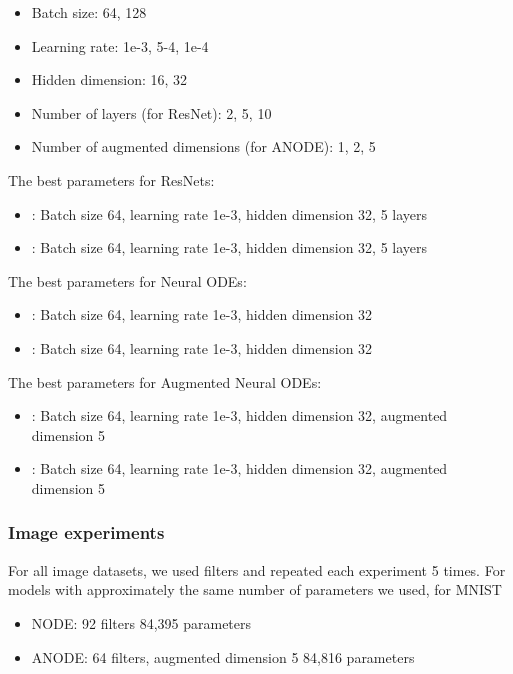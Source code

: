 \documentclass{article}
\begin{document}
\begin{itemize}
    \item Batch size: 64, 128
    \item Learning rate: 1e-3, 5-4, 1e-4
    \item Hidden dimension: 16, 32 
    \item Number of layers (for ResNet): 2, 5, 10
    \item Number of augmented dimensions (for ANODE): 1, 2, 5
\end{itemize}

The best parameters for ResNets:

\begin{itemize}
    \item : Batch size 64, learning rate 1e-3, hidden dimension 32, 5 layers
    \item : Batch size 64, learning rate 1e-3, hidden dimension 32, 5 layers
\end{itemize}

The best parameters for Neural ODEs:

\begin{itemize}
    \item : Batch size 64, learning rate 1e-3, hidden dimension 32
    \item : Batch size 64, learning rate 1e-3, hidden dimension 32
\end{itemize}

The best parameters for Augmented Neural ODEs:

\begin{itemize}
    \item : Batch size 64, learning rate 1e-3, hidden dimension 32, augmented dimension 5
    \item : Batch size 64, learning rate 1e-3, hidden dimension 32, augmented dimension 5
\end{itemize}

\subsubsection{Image experiments}

For all image datasets, we used  filters and repeated each experiment 5 times. For models with approximately the same number of parameters we used, for MNIST

\begin{itemize}
    \item NODE: 92 filters  84,395 parameters
    \item ANODE: 64 filters, augmented dimension 5  84,816 parameters
\end{itemize} 
\end{document}
